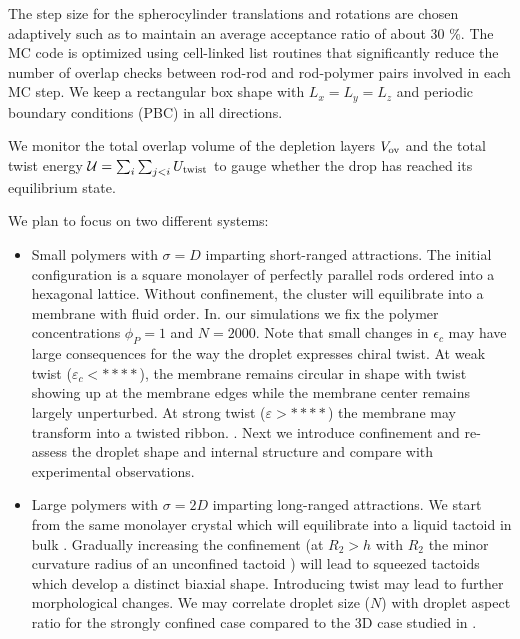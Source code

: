 The step size for the spherocylinder translations and rotations are chosen adaptively such as to maintain an average acceptance ratio of about 30 \%. The MC code is optimized using cell-linked list routines that significantly reduce the number of overlap checks between rod-rod and rod-polymer pairs involved in each MC step. We keep a rectangular box shape with $L_{x} = L_{y} =L_{z}$ and periodic boundary conditions (PBC) in all directions.

We monitor the total overlap volume of the depletion layers $V_{\rm ov}$ and the total twist energy $\mathcal{U}  = \sum_{i}\sum_{j<i}U_{\rm twist}$ to gauge whether the drop has reached its equilibrium state.

We plan to focus on two different systems:

\begin{itemize}
\item  Small polymers with $\sigma = D$ imparting short-ranged attractions. The initial configuration is a square monolayer of perfectly parallel rods ordered into a hexagonal lattice. Without confinement, the cluster will equilibrate into a membrane with  fluid order. In. our simulations we fix the polymer concentrations $\phi_{P}=1$ and $N=2000$. Note that small changes in $\epsilon_{c}$ may have large consequences for the way the droplet expresses chiral twist. At weak twist ($\varepsilon_{c} < ****$), the membrane remains circular in shape with twist showing up at the membrane edges while the membrane center remains largely unperturbed. At strong twist ($\varepsilon > ****$) the membrane may transform into a twisted ribbon. .  Next we introduce confinement and re-assess the droplet shape and internal structure and compare with experimental observations.

\item Large polymers with $\sigma = 2 D$ imparting long-ranged attractions. We start from the same monolayer crystal which will equilibrate into a liquid tactoid in bulk \cite{kuhnhold2022structure}. Gradually increasing the confinement (at $R_{2} > h$ with $R_{2}$ the minor curvature radius of an unconfined tactoid \cite{kuhnhold2022structure})  will lead to squeezed tactoids which  develop a distinct biaxial shape. Introducing twist may lead to further morphological changes. We may correlate droplet size ($N$) with droplet aspect ratio for the strongly confined case compared to the 3D case studied in \cite{kuhnhold2022structure}.

\end{itemize}

